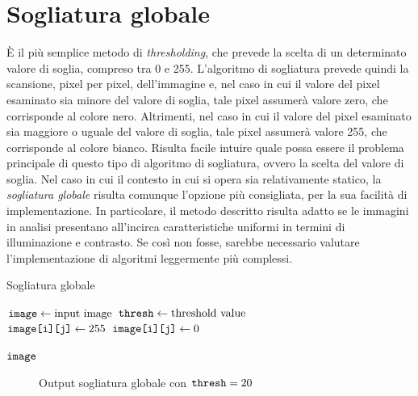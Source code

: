 \section{Sogliatura globale}
\label{sec:image-bin-global}
\`E il pi\`u semplice metodo di \textit{thresholding}, che prevede la scelta di un determinato valore di soglia, compreso tra 0 e 255. L'algoritmo di sogliatura prevede quindi la scansione, pixel per pixel, dell'immagine e, nel caso in cui il valore del pixel esaminato sia minore del valore di soglia, tale pixel assumer\`a valore zero, che corrisponde al colore nero. Altrimenti, nel caso in cui il valore del pixel esaminato sia maggiore o uguale del valore di soglia, tale pixel assumer\`a valore 255, che corrisponde al colore bianco. Risulta facile intuire quale possa essere il problema principale di questo tipo di algoritmo di sogliatura, ovvero la scelta del valore di soglia.
Nel caso in cui il contesto in cui si opera sia relativamente statico, la \textit{sogliatura globale} risulta comunque l'opzione pi\`u consigliata, per la sua facilit\`a di implementazione. In particolare, il metodo descritto risulta adatto se le immagini in analisi presentano all'incirca caratteristiche uniformi in termini di illuminazione e contrasto. Se cos\`i non fosse, sarebbe necessario valutare l'implementazione di algoritmi leggermente pi\`u complessi.
\begin{algorithm}
	\caption{Sogliatura globale}
	\label{alg:thresh-global}
	\begin{algorithmic}[1]
			\State $\texttt{image} \gets \text{input image}$
			\State $\texttt{thresh} \gets \text{threshold value}$
			\\
						\State $\texttt{image[i][j]} \gets 255$
					\Else
						\State $\texttt{image[i][j]} \gets 0$
					\EndIf
				\EndFor
			\EndFor

			\Return $\texttt{image}$
		\EndFunction
	\end{algorithmic}
\end{algorithm}
\begin{figure}[H]
	\centering
	\caption{Output sogliatura globale con $\texttt{thresh}=20$}
	\label{fig:image-bin-global}
\end{figure}


